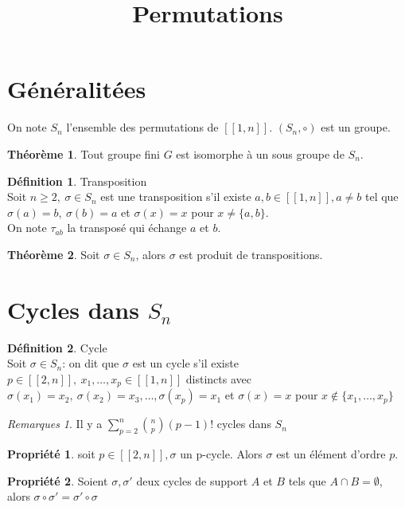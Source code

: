 \documentclass[fleqn]{article}
\title{Permutations}
\date{}
\theoremstyle{definition} \newtheorem*{defi}{D\'efinition}
\theoremstyle{definition} \newtheorem*{theo}{Th\'eor\`eme}
\theoremstyle{definition} \newtheorem*{coro}{Corollaire}
\theoremstyle{definition} \newtheorem*{nota}{Notation}
\theoremstyle{definition} \newtheorem*{vocab}{Vocabulaire}
\theoremstyle{remark} \newtheorem*{rqs}{Remarques}
\theoremstyle{definition} \newtheorem*{prop}{Propri\'et\'e}
\begin{document}
\maketitle

\section{G\'en\'eralit\'ees}
On note $S_n$ l'ensemble des permutations de $[\![1,n]\!]$. $(S_n, \circ)$ est un groupe.

\begin{theo}
	Tout groupe fini $G$ est isomorphe \`a un sous groupe de $S_n$.
\end{theo}

\begin{defi} Transposition\\
	Soit $n \geq 2,\ \sigma \in S_n$ est une transposition s'il existe $a,b \in [\![1,n]\!], a \neq b$ tel que $\sigma(a) = b,\ \sigma(b) = a$ et
	$\sigma(x) = x$ pour $x \neq \{a,b\}$. \\
	On note $\tau_{ab}$ la transpos\'e qui \'echange $a$ et $b$.
\end{defi}

\begin{theo}
	Soit $\sigma \in S_n$, alors $\sigma$ est produit de transpositions.
\end{theo}

\section{Cycles dans $S_n$}

\begin{defi} Cycle\\
	Soit $\sigma \in S_n$: on dit que $\sigma$ est un cycle s'il existe $p \in [\![2,n]\!],\ x_1, \hdots, x_p \in [\![1,n]\!]$ distincts avec
	$\sigma(x_1) = x_2,\ \sigma(x_2) = x_3, \hdots, \sigma(x_p) = x_1$ et $\sigma(x) = x$ pour \mbox{$x \notin \{x_1, \hdots, x_p\}$}
	\begin{rqs}
		Il y a $\sum_{p=2}^n \binom{n}{p}(p-1)!$ cycles dans $S_n$
	\end{rqs}
\end{defi}

\begin{prop}
	soit $p \in [\![2,n]\!], \sigma$ un p-cycle. Alors $\sigma$ est un \'el\'ement d'ordre $p$.
\end{prop}

\begin{prop}
	Soient $\sigma, \sigma'$ deux cycles de support $A$ et $B$ tels que $A \cap B = \emptyset$, alors $\sigma \circ \sigma' = \sigma'
	\circ \sigma$
\end{prop}
\end{document}
